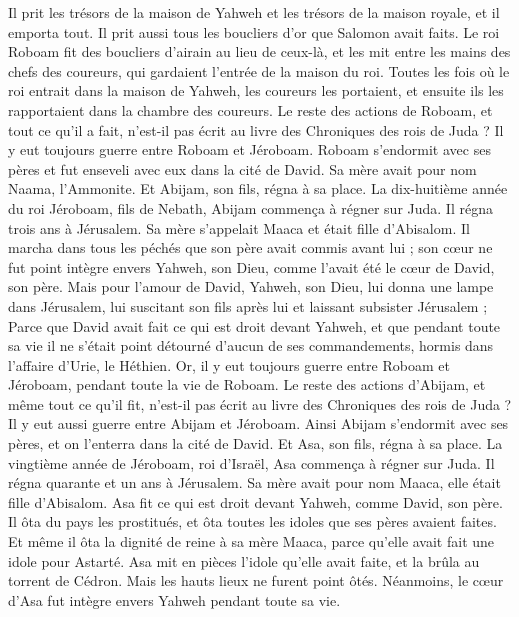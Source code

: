 \begin{multicols}{2}
Il prit les trésors de la maison de Yahweh et les trésors de la maison royale, et il emporta tout. Il prit aussi tous les boucliers d'or que Salomon avait faits.
Le roi Roboam fit des boucliers d'airain au lieu de ceux-là, et les mit entre les mains des chefs des coureurs, qui gardaient l’entrée de la maison du roi.
Toutes les fois où le roi entrait dans la maison de Yahweh, les coureurs les portaient, et ensuite ils les rapportaient dans la chambre des coureurs.
Le reste des actions de Roboam, et tout ce qu'il a fait, n'est-il pas écrit au livre des Chroniques des rois de Juda ?
Il y eut toujours guerre entre Roboam et Jéroboam.
Roboam s'endormit avec ses pères et fut enseveli avec eux dans la cité de David. Sa mère avait pour nom Naama, l’Ammonite. Et Abijam, son fils, régna à sa place.
\VerseOne{}La dix-huitième année du roi Jéroboam, fils de Nebath, Abijam commença à régner sur Juda.
Il régna trois ans à Jérusalem. Sa mère s’appelait Maaca et était fille d'Abisalom.
Il marcha dans tous les péchés que son père avait commis avant lui ; son cœur ne fut point intègre envers Yahweh, son Dieu, comme l'avait été le cœur de David, son père.
Mais pour l'amour de David, Yahweh, son Dieu, lui donna une lampe dans Jérusalem, lui suscitant son fils après lui et laissant subsister Jérusalem ;
Parce que David avait fait ce qui est droit devant Yahweh, et que pendant toute sa vie il ne s'était point détourné d’aucun de ses commandements, hormis dans l'affaire d'Urie, le Héthien.
Or, il y eut toujours guerre entre Roboam et Jéroboam, pendant toute la vie de Roboam.
Le reste des actions d'Abijam, et même tout ce qu'il fit, n'est-il pas écrit au livre des Chroniques des rois de Juda ? Il y eut aussi guerre entre Abijam et Jéroboam.
Ainsi Abijam s'endormit avec ses pères, et on l'enterra dans la cité de David. Et Asa, son fils, régna à sa place.
La vingtième année de Jéroboam, roi d'Israël, Asa commença à régner sur Juda.
Il régna quarante et un ans à Jérusalem. Sa mère avait pour nom Maaca, elle était fille d'Abisalom.
Asa fit ce qui est droit devant Yahweh, comme David, son père.
Il ôta du pays les prostitués, et ôta toutes les idoles que ses pères avaient faites.
Et même il ôta la dignité de reine à sa mère Maaca, parce qu'elle avait fait une idole pour Astarté. Asa mit en pièces l’idole qu'elle avait faite, et la brûla au torrent de Cédron.
Mais les hauts lieux ne furent point ôtés. Néanmoins, le cœur d'Asa fut intègre envers Yahweh pendant toute sa vie.

\end{multicols}

